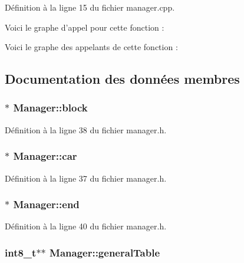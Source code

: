 Définition à la ligne 15 du fichier manager.\-cpp.



Voici le graphe d'appel pour cette fonction \-:




Voici le graphe des appelants de cette fonction \-:




\subsection{Documentation des données membres}
\hypertarget{class_manager_a9301f6e9bd2feee2719b2ff82b49a85e}{
\subsubsection[{block}]{$\ast$ Manager\-::block}}\label{class_manager_a9301f6e9bd2feee2719b2ff82b49a85e}


Définition à la ligne 38 du fichier manager.\-h.

\hypertarget{class_manager_a2803dff8e8f2912242f4098991d91415}{
\subsubsection[{car}]{$\ast$ Manager\-::car}}\label{class_manager_a2803dff8e8f2912242f4098991d91415}


Définition à la ligne 37 du fichier manager.\-h.

\hypertarget{class_manager_aec87028a71ab7b031977ac12a086658d}{
\subsubsection[{end}]{$\ast$ Manager\-::end}}\label{class_manager_aec87028a71ab7b031977ac12a086658d}


Définition à la ligne 40 du fichier manager.\-h.

\hypertarget{class_manager_ad5d59f4a2b1de265115f4efbbbc60dcd}{
\subsubsection[{general\-Table}]{\setlength{\rightskip}{0pt plus 5cm}int8\-\_\-t$\ast$$\ast$ Manager\-::general\-Table\hspace{0.3cm}{\ttfamily [private]}}}\label{class_manager_ad5d59f4a2b1de265115f4efbbbc60dcd}


